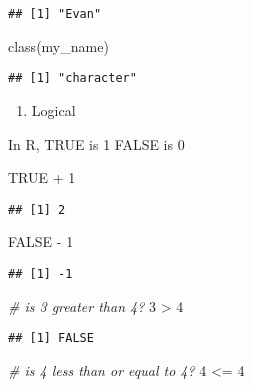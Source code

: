 \documentclass[
]{article}
\newenvironment{Shaded}{\begin{snugshade}}{\end{snugshade}}
\newcommand{\CommentTok}[1]{\textcolor[rgb]{0.56,0.35,0.01}{\textit{#1}}}
\newcommand{\ConstantTok}[1]{\textcolor[rgb]{0.00,0.00,0.00}{#1}}
\newcommand{\DecValTok}[1]{\textcolor[rgb]{0.00,0.00,0.81}{#1}}
\newcommand{\FunctionTok}[1]{\textcolor[rgb]{0.00,0.00,0.00}{#1}}
\newcommand{\NormalTok}[1]{#1}
\newcommand{\SpecialCharTok}[1]{\textcolor[rgb]{0.00,0.00,0.00}{#1}}
\providecommand{\tightlist}{%
  \setlength{\itemsep}{0pt}\setlength{\parskip}{0pt}}
\begin{document}
\begin{verbatim}
## [1] "Evan"
\end{verbatim}

\begin{Shaded}
\begin{Highlighting}[]
\FunctionTok{class}\NormalTok{(my\_name)}
\end{Highlighting}
\end{Shaded}

\begin{verbatim}
## [1] "character"
\end{verbatim}

\begin{enumerate}
\def\labelenumi{\arabic{enumi}.}
\setcounter{enumi}{2}
\tightlist
\item
  Logical
\end{enumerate}

In R, TRUE is 1 FALSE is 0

\begin{Shaded}
\begin{Highlighting}[]
\ConstantTok{TRUE} \SpecialCharTok{+} \DecValTok{1}
\end{Highlighting}
\end{Shaded}

\begin{verbatim}
## [1] 2
\end{verbatim}

\begin{Shaded}
\begin{Highlighting}[]
\ConstantTok{FALSE} \SpecialCharTok{{-}} \DecValTok{1}
\end{Highlighting}
\end{Shaded}

\begin{verbatim}
## [1] -1
\end{verbatim}

\begin{Shaded}
\begin{Highlighting}[]
\CommentTok{\# is 3 greater than 4?}
\DecValTok{3} \SpecialCharTok{\textgreater{}} \DecValTok{4}
\end{Highlighting}
\end{Shaded}

\begin{verbatim}
## [1] FALSE
\end{verbatim}

\begin{Shaded}
\begin{Highlighting}[]
\CommentTok{\# is 4 less than or equal to 4?}
\DecValTok{4} \SpecialCharTok{\textless{}=} \DecValTok{4}
\end{Highlighting}
\end{Shaded}
\end{document}
